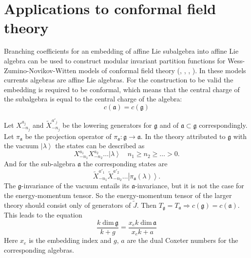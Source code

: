 \documentclass[a4paper,12pt]{article}
\theoremstyle{definition} \newtheorem{Def}{Definition}
\begin{document}
\section{Applications to conformal field theory}
\label{sec:phys-appl}

Branching coefficients for an embedding of affine Lie subalgebra into
affine Lie algebra can be used to construct modular invariant
partition functions for Wess-Zumino-Novikov-Witten models of conformal field theory (\cite{difrancesco1997cft}, \cite{Walton:1999xc}, \cite{walton1989conformal}, \cite{schellekens1986conformal}). In these models currents algebras are affine Lie algebras.  For the construction to be valid the embedding is required to be conformal, which means that the central charge of the subalgebra is equal to the central charge of the algebra:
\begin{equation}
  \label{eq:31}
  c(\mathfrak{a})=c(\mathfrak{g})
\end{equation}


Let $X^{a_j}_{-n_j}$ and $\tilde{X}^{a'_j}_{-n_j}$ be the lowering generators for $\mathfrak{g}$ and of $\mathfrak{a}\subset\mathfrak{g}$ correspondingly. Let $\pi_{\mathfrak{a}}$ be the projection operator of $\pi_{\mathfrak{a}}:\mathfrak{g}\longrightarrow \mathfrak{a}$. In the theory attributed to $\mathfrak{g}$ with the vacuum $\left|\lambda\right>$ the states can be described as 
\begin{equation}
  \label{eq:109}
  X^{a_1}_{-n_1}X^{a_2}_{-n_2}\dots\left|\lambda\right>\quad n_1\geq n_2\geq \dots>0.
\end{equation}
And for the sub-algebra $\mathfrak{a}$ the corresponding states are
\begin{equation}
  \label{eq:110}
  \tilde{X}^{a'_1}_{-n_1}\tilde{X}^{a'_2}_{-n_2}\dots\left|\pi_{\mathfrak{a}}(\lambda)\right>.
\end{equation}
The $\mathfrak{g}$-invariance of the vacuum entails its $\mathfrak{a}$-invariance, but it is not the case for the energy-momentum tensor. So the energy-momentum tensor of the larger theory should consist only of generators of $\tilde{J}$. Then $T_{\mathfrak{g}}=T_{\mathfrak{a}}\Rightarrow c(\mathfrak{g})=c(\mathfrak{a})$. This leads to the equation
\begin{equation}
  \label{eq:111}
  \frac{k\;\mathrm{dim}\,\mathfrak{g}}{k+g}=\frac{x_e k\; \mathrm{dim}\,\mathfrak{a}}{x_ek+a}
\end{equation}
Here $x_e$ is the embedding index and $g$, $a$ are the dual Coxeter numbers for the  corresponding algebras.
\end{document}
